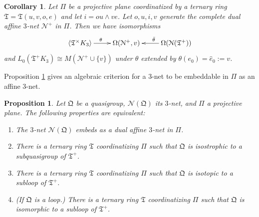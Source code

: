 \documentclass[reqno,12pt]{amsart}
\newtheorem{cor}[thm]{Corollary}
\newtheorem{prop}[thm]{Proposition}
\theoremstyle{remark}
\numberwithin{equation}{section}
\numberwithin{figure}{section}
\newcommand \bgr[1]{\langle#1\rangle}
\newcommand \cN{\mathcal{N}}
\newcommand \fQ{\mathfrak Q}
\newcommand \fT{\mathfrak T}
\newcommand \he{{\hat e}}
\newcommand\Qez{e_0}
\newcommand\PP{\Pi}	%
\begin{document}
\begin{cor}  \label{CD:orthoring}
Let $\PP$ be a projective plane coordinatized by a ternary ring $\fT=\fT(u,v,o,e)$ and let $i=ou \wedge ve$.  Let $o,u,i,v$ generate the complete dual affine $3$-net $\cN^+$ in $\PP$.   
Then 
we have isomorphisms
$$
\xymatrix{
\bgr{\fT^\times K_3} \ar[r]^(.45){\theta} 
&\Omega(\cN^+,v)
&\Omega(\cN(\fT^+)) \ar[l]_(.45){\bar\theta}
}
$$
and 
$L_0(\fT^+ K_3) \cong M(\cN^+ \cup \{v\})$ under $\theta$ extended by $\theta(\Qez) = \he_0 := v$. 
\end{cor}


Proposition \ref{L:affnet} gives an algebraic criterion for a $3$-net to be embeddable in $\PP$ as an affine $3$-net.

\begin{prop} \label{L:affnet} 
Let $\fQ$ be a quasigroup, $\cN(\fQ)$ its $3$-net, and $\PP$ a projective plane.
The following properties are equivalent:
%
\begin{enumerate}[{\rm(a)}]
\item The $3$-net $\cN(\fQ)$ embeds as a dual affine $3$-net in $\PP$.
\item There is a ternary ring $\fT$ coordinatizing $\PP$ such that $\fQ$ is isostrophic to a subquasigroup of $\fT^+$.
\item There is a ternary ring $\fT$ coordinatizing $\PP$ such that $\fQ$ is isotopic to a subloop of $\fT^+$.
\item (If $\fQ$ is a loop.)  There is a ternary ring $\fT$ coordinatizing $\PP$ such that $\fQ$ is isomorphic to a subloop of $\fT^+$.
\end{enumerate}
%
\end{prop}
\end{document}
